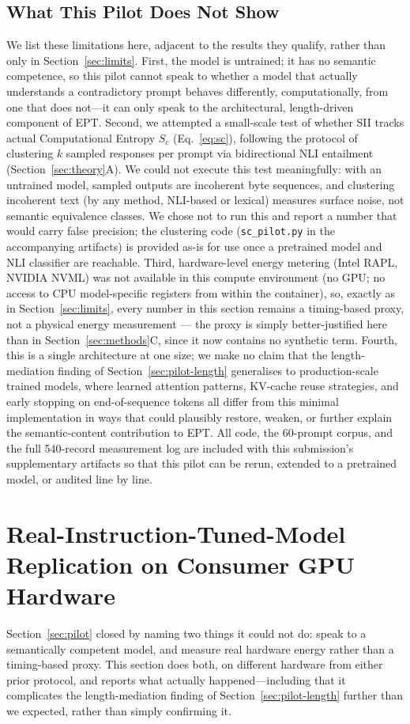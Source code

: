 \documentclass[conference]{IEEEtran}
\begin{document}
\subsection{What This Pilot Does Not Show}
\label{sec:pilot-limits}
We list these limitations here, adjacent to the results they qualify,
rather than only in Section~\ref{sec:limits}. First, the model is
untrained; it has no semantic competence, so this pilot cannot speak
to whether a model that actually understands a contradictory prompt
behaves differently, computationally, from one that does not---it
can only speak to the architectural, length-driven component of EPT.
Second, we attempted a small-scale test of whether SII tracks actual
Computational Entropy $S_c$ (Eq.~\ref{eq:sc}), following the protocol
of clustering $k$ sampled responses per prompt via bidirectional NLI
entailment (Section~\ref{sec:theory}A). We could not execute this
test meaningfully: with an untrained model, sampled outputs are
incoherent byte sequences, and clustering incoherent text (by any
method, NLI-based or lexical) measures surface noise, not semantic
equivalence classes. We chose not to run this and report a number
that would carry false precision; the clustering code
(\texttt{sc\_pilot.py} in the accompanying artifacts) is provided
as-is for use once a pretrained model and NLI classifier are
reachable. Third, hardware-level energy metering (Intel RAPL, NVIDIA
NVML) was not available in this compute environment (no GPU; no
access to CPU model-specific registers from within the container),
so, exactly as in Section~\ref{sec:limits}, every number in this
section remains a timing-based proxy, not a physical energy
measurement --- the proxy is simply better-justified here than in
Section~\ref{sec:methods}C, since it now contains no synthetic term.
Fourth, this is a single architecture at one size; we make no claim
that the length-mediation finding of Section~\ref{sec:pilot-length}
generalises to production-scale trained models, where learned
attention patterns, KV-cache reuse strategies, and early stopping on
end-of-sequence tokens all differ from this minimal implementation in
ways that could plausibly restore, weaken, or further explain the
semantic-content contribution to EPT. All code, the 60-prompt corpus,
and the full 540-record measurement log are included with this
submission's supplementary artifacts so that this pilot can be
rerun, extended to a pretrained model, or audited line by line.
\section{Real-Instruction-Tuned-Model Replication on Consumer GPU Hardware}
\label{sec:real}
Section~\ref{sec:pilot} closed by naming two things it could not do:
speak to a semantically competent model, and measure real hardware
energy rather than a timing-based proxy. This section does both, on
different hardware from either prior protocol, and reports what
actually happened---including that it complicates the length-mediation
finding of Section~\ref{sec:pilot-length} further than we expected,
rather than simply confirming it.
\end{document}
